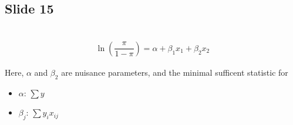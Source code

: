 \subsection{Slide 15}\hfill\\
\begin{equation*}
  \begin{gathered}
    \ln{\left(\dfrac{\pi}{1-\pi}\right)} = \alpha+\beta_1x_1+\beta_2x_2
  \end{gathered}
\end{equation*}\par
\noindent Here, $\alpha$ and $\beta_2$ are nuisance parameters, and the minimal sufficent statistic for \par
\begin{itemize}
  \item $\alpha$: $\sum y$
  \item $\beta_j$: $\sum y_i x_{ij}$
\end{itemize}
